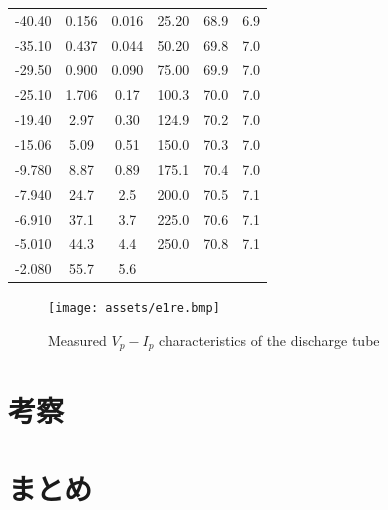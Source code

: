 \documentclass[dvipdfmx]{jsarticle}
\begin{document}
\begin{table}[H]
{\begin{tabular}{ccc|ccc}
        -40.40 & 0.156   & 0.016   & 25.20                & 68.9                 & 6.9                  \\
        -35.10 & 0.437   & 0.044   & 50.20                & 69.8                 & 7.0                  \\
        -29.50 & 0.900   & 0.090   & 75.00                & 69.9                 & 7.0                  \\
        -25.10 & 1.706   & 0.17    & 100.3                & 70.0                 & 7.0                  \\
        -19.40 & 2.97    & 0.30    & 124.9                & 70.2                 & 7.0                  \\
        -15.06 & 5.09    & 0.51    & 150.0                & 70.3                 & 7.0                  \\
        -9.780 & 8.87    & 0.89    & 175.1                & 70.4                 & 7.0                  \\
        -7.940 & 24.7    & 2.5     & 200.0                & 70.5                 & 7.1                  \\
        -6.910 & 37.1    & 3.7     & 225.0                & 70.6                 & 7.1                  \\
        -5.010 & 44.3    & 4.4     & 250.0                & 70.8                 & 7.1                  \\
        -2.080 & 55.7    & 5.6     & \multicolumn{1}{l}{} & \multicolumn{1}{l}{} & \multicolumn{1}{l}{} \\ \hline
        \end{tabular}%
        }
        \end{table}

        
        \begin{figure}[H]
        \centering
        \texttt{[image: assets/e1re.bmp]}
        \caption{Measured $V_p - I_p$ characteristics of the discharge tube}\label{fig:6}
        \end{figure}
        
        
\section{考察}
\section{まとめ}



% 
%  
\end{document}
